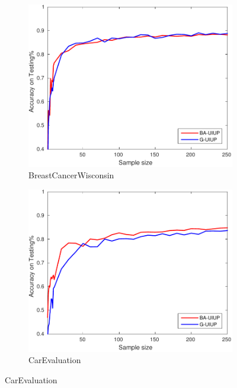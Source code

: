\begin{figure}[ht]
	\centering

  \begin{subfigure}[b]{0.3\textwidth}
		\centering
		\includegraphics[width=\textwidth]{figs/PLPTF/Trees/BreastCancerWisconsinDownsampled_Trees_X_MH.pdf}
		\caption{BreastCancerWisconsin}
		\label{fig:B1}
	\end{subfigure}
  \begin{subfigure}[b]{0.3\textwidth}
		\centering
  	\includegraphics[width=\textwidth]{figs/PLPTF/Trees/CarEvaluation_Trees_X_MH.pdf}
  	\caption{CarEvaluation}
		\label{fig:Car1}

\end{subfigure}
\end{figure}
